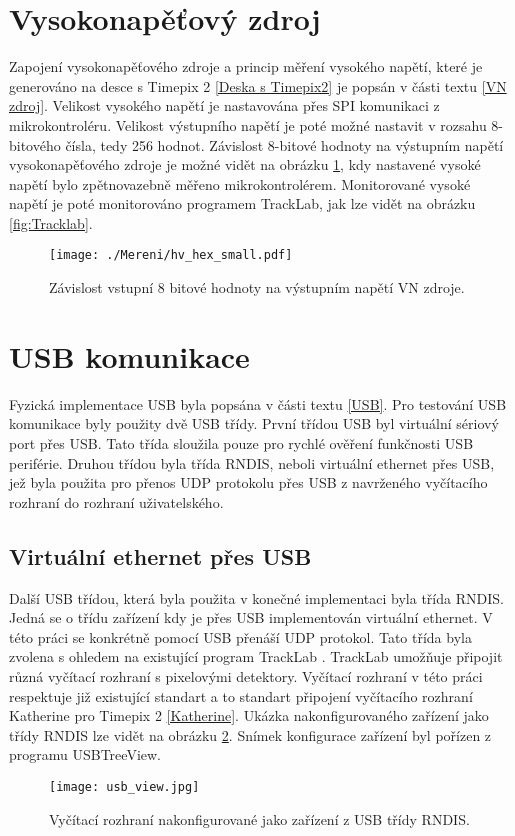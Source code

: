\section{Vysokonapěťový zdroj}
Zapojení vysokonapěťového zdroje a princip měření vysokého napětí, které je generováno na desce s Timepix 2 \ref{Deska s Timepix2} je popsán v části textu \ref{VN zdroj}. Velikost vysokého napětí je nastavována přes SPI komunikaci z mikrokontroléru. Velikost výstupního napětí je poté možné nastavit v rozsahu 8-bitového čísla, tedy 256 hodnot. Závislost 8-bitové hodnoty na výstupním napětí vysokonapěťového zdroje je možné vidět na obrázku \ref{fig:hv_hex}, kdy nastavené vysoké napětí bylo zpětnovazebně měřeno mikrokontrolérem. Monitorované vysoké napětí je poté monitorováno programem TrackLab, jak lze vidět na obrázku \ref{fig:Tracklab}.
\begin{figure}[h!]
	\centering
	\captionsetup{justification=centering}
	\texttt{[image: ./Mereni/hv\_hex\_small.pdf]}
	\caption{Závislost vstupní 8 bitové hodnoty na výstupním napětí VN zdroje.} 
	\label{fig:hv_hex}
\end{figure}

\section{USB komunikace}
Fyzická implementace USB byla popsána v části textu \ref{USB}. Pro testování USB komunikace byly použity dvě USB třídy. První třídou USB byl virtuální sériový port přes USB. Tato třída sloužila pouze pro rychlé ověření funkčnosti USB periférie. Druhou třídou byla třída RNDIS, neboli virtuální ethernet přes USB, jež byla použita pro přenos UDP protokolu přes USB z navrženého vyčítacího rozhraní do rozhraní uživatelského.
\subsection{Virtuální ethernet přes USB}
Další USB třídou, která byla použita v konečné implementaci byla třída RNDIS. Jedná se o třídu zařízení kdy je přes USB implementován virtuální ethernet. V této práci se konkrétně pomocí USB přenáší UDP protokol. Tato třída byla zvolena s ohledem na existující program TrackLab \cite{Manek_2024}. TrackLab umožňuje připojit různá vyčítací rozhraní s pixelovými detektory. Vyčítací rozhraní v této práci respektuje již existující standart a to standart připojení vyčítacího rozhraní Katherine pro Timepix 2 \ref{Katherine}. Ukázka nakonfigurovaného zařízení jako třídy RNDIS lze vidět na obrázku \ref{fig:RNDIS}. Snímek konfigurace zařízení byl pořízen z programu USBTreeView. 
\begin{figure}[h!]
	\centering
	\captionsetup{justification=centering}
	\texttt{[image: usb\_view.jpg]}
	\caption{Vyčítací rozhraní nakonfigurované jako zařízení z USB třídy RNDIS.} 
	\label{fig:RNDIS}
\end{figure}

